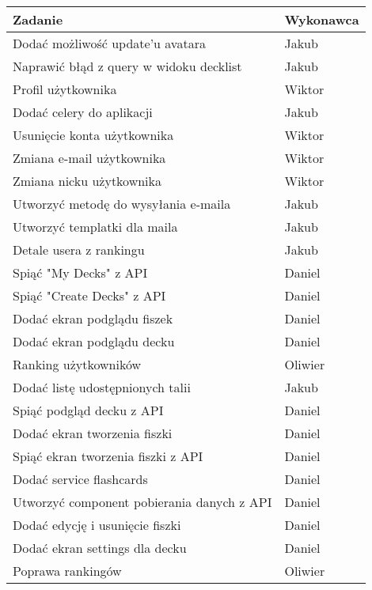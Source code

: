 \begin{longtable}{|p{}|p{}|}
    \hline
    \textbf{Zadanie} & \textbf{Wykonawca} \\
    \hline
    [MOBILE] Dodać możliwość update'u avatara & Jakub \\
    \hline
    [MOBILE] Naprawić błąd z query w widoku decklist & Jakub \\
    \hline
    [WEB] Profil użytkownika & Wiktor \\
    \hline
    [BACKEND] Dodać celery do aplikacji & Jakub \\
    \hline
    [WEB] Usunięcie konta użytkownika & Wiktor \\
    \hline
    [WEB] Zmiana e-mail użytkownika & Wiktor \\
    \hline
    [WEB] Zmiana nicku użytkownika & Wiktor \\
    \hline
    [BACKEND] Utworzyć metodę do wysyłania e-maila & Jakub \\
    \hline
    [BACKEND] Utworzyć templatki dla maila & Jakub \\
    \hline
    [MOBILE] Detale usera z rankingu & Jakub \\
    \hline
    [MOBILE] Spiąć "My Decks" z API & Daniel \\
    \hline
    [MOBILE] Spiąć "Create Decks" z API & Daniel \\
    \hline
    [MOBILE] Dodać ekran podglądu fiszek & Daniel \\
    \hline
    [MOBILE] Dodać ekran podglądu decku & Daniel \\
    \hline
    [WEB] Ranking użytkowników & Oliwier \\
    \hline
    [MOBILE] Dodać listę udostępnionych talii & Jakub \\
    \hline
    [MOBILE] Spiąć podgląd decku z API & Daniel \\
    \hline
    [MOBILE] Dodać ekran tworzenia fiszki & Daniel \\
    \hline
    [MOBILE] Spiąć ekran tworzenia fiszki z API & Daniel \\
    \hline
    [MOBILE] Dodać service flashcards & Daniel \\
    \hline
    [MOBILE] Utworzyć component pobierania danych z API & Daniel \\
    \hline
    [MOBILE] Dodać edycję i usunięcie fiszki & Daniel \\
    \hline
    [MOBILE] Dodać ekran settings dla decku & Daniel \\
    \hline
    [WEB] Poprawa rankingów & Oliwier \\

\end{longtable}
